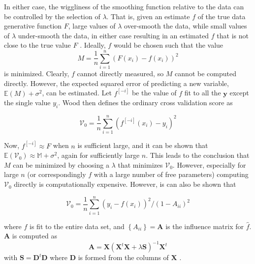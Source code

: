 \documentclass[phdcss]{SDSUThesis}
\begin{document}
In either case, the wiggliness of the smoothing function relative to the data can be controlled by the selection of $\lambda$. That is, given an estimate $f$ of the true data generative function $F$, large values of $\lambda$ over-smooth the data, while small values of $\lambda$ under-smooth the data, in either case resulting in an estimated $f$ that is not close to the true value $F$ \cite{wood-2017}. Ideally, $f$ would be chosen such that the value
\begin{equation}
   M = \frac{1}{n} \sum_{i=1}^n (F(x_i)-f(x_i))^2
\end{equation}
is minimized. Clearly, $f$ cannot directly measured, so $M$ cannot be computed directly. However, the expected squared error of predicting a new variable, $\mathbb{E}(M)+\sigma^2$, can be estimated. Let $f^{[-i]}$ be the value of $f$ fit to all the $\mathbf{y}$ except the single value $y_i$. Wood \cite{wood-2017} then defines the ordinary cross validation score as

\begin{equation}\label{OrdinaryCrossValidation}
\mathcal{V}_0 = \frac{1}{n} \sum_{i=1}^n (f^{[-i]}(x_i) - y_i)^2
\end{equation}

Now, $f^{[-i]} \approx F$ when $n$ is sufficient large, and it can be shown \cite{wood-2017} that $\mathbb{E}(\mathcal{V}_0) \approx \mathbb{M}+\sigma^2$, again for sufficiently large $n$. This leads to the conclusion that $M$ can be minimized by choosing a $\lambda$ that minimizes $\mathcal{V}_0$. However, especially for large $n$ (or correspondingly $f$ with a large number of free parameters) computing $\mathcal{V}_0$ directly is computationally expensive. However, is can also be shown \cite{wood-2017} that

\begin{equation}\label{OrdinaryCrossValidationInfluence}
\mathcal{V}_0 = \frac{1}{n} \sum_{i=1}^n (y_i - f(x_i))^2 / (1-A_{ii})^2
\end{equation}

where $f$ is fit to the entire data set, and $\left\{ A_{ii} \right\} = \mathbf{A}$ is the influence matrix for $\widehat{f}$. $\mathbf{A}$ is computed as
\begin{equation}\label{InfluenceMatrix}
\mathbf{A} = \mathbf{X} \left( \mathbf{X}^t \mathbf{X} + \lambda \mathbf{S} \right)^{-1} \mathbf{X}^t   
\end{equation} with $\mathbf{S} = \mathbf{D}^t \mathbf{D}$ where $\mathbf{D}$ is formed from the columns of $\mathbf{X}$ \cite{wood-2017}.
\end{document}
